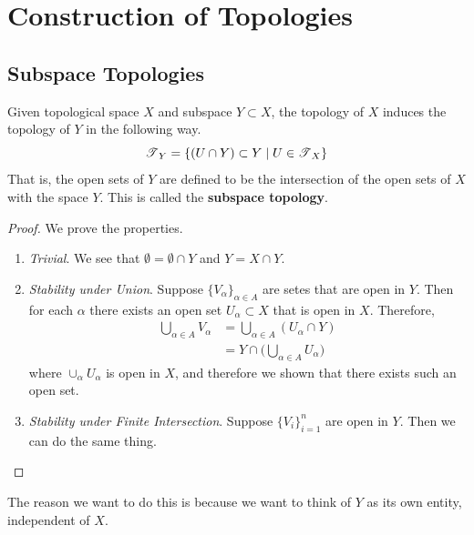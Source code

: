 \section{Construction of Topologies} 

  \subsection{Subspace Topologies} 

    \begin{theorem}
      Given topological space $X$ and subspace $Y \subset X$, the topology of $X$ induces the topology of $Y$ in the following way. 
      \begin{equation}
        \T_Y = \{(U \cap Y) \subset Y \;|\; U \in \T_X\}
      \end{equation}
      That is, the open sets of $Y$ are defined to be the intersection of the open sets of $X$ with the space $Y$. This is called the \textbf{subspace topology}. 
    \end{theorem} 
    \begin{proof}
      We prove the properties. 
      \begin{enumerate}
        \item \textit{Trivial}. We see that $\emptyset = \emptyset \cap Y$ and $Y = X \cap Y$. 
        \item \textit{Stability under Union}. Suppose $\{V_\alpha\}_{\alpha \in A}$ are setes that are open in $Y$. Then for each $\alpha$ there exists an open set $U_\alpha \subset X$ that is open in $X$. Therefore, 
        \begin{align}
          \bigcup_{\alpha \in A} V_\alpha & = \bigcup_{\alpha \in A} (U_\alpha \cap Y) \\ 
                                          & = Y \cap \bigg( \bigcup_{\alpha \in A} U_\alpha \bigg)
        \end{align}
        where $\cup_\alpha U_\alpha$ is open in $X$, and therefore we shown that there exists such an open set. 

        \item \textit{Stability under Finite Intersection}. Suppose $\{V_i\}_{i = 1}^n$ are open in $Y$. Then we can do the same thing. 
      \end{enumerate}
    \end{proof}

    The reason we want to do this is because we want to think of $Y$ as its own entity, independent of $X$. 

